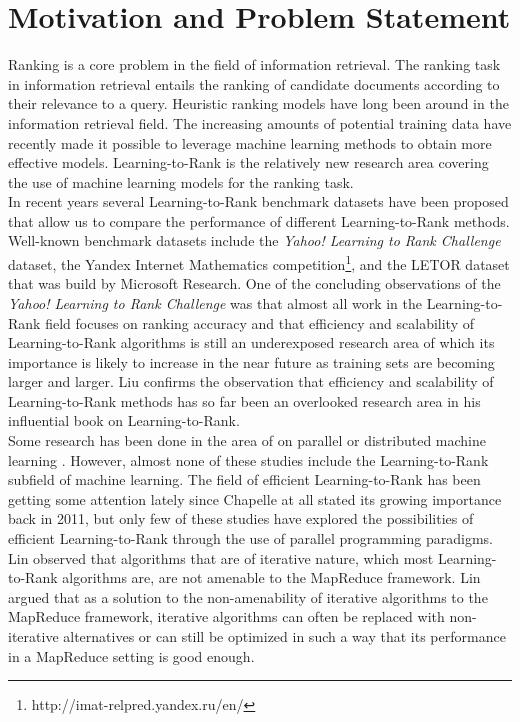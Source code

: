 \chapter{Motivation and Problem Statement}
Ranking is a core problem in the field of information retrieval. The ranking task in information retrieval entails the ranking of candidate documents according to their relevance to a query. Heuristic ranking models have long been around in the information retrieval field. The increasing amounts of potential training data have recently made it possible to leverage machine learning methods to obtain more effective models. Learning-to-Rank is the relatively new research area covering the use of machine learning models for the ranking task.\\

In recent years several Learning-to-Rank benchmark datasets have been proposed that allow us to compare the performance of different Learning-to-Rank methods. Well-known benchmark datasets include the \emph{Yahoo! Learning to Rank Challenge} dataset\cite{Chapelle2011a}, the Yandex Internet Mathematics competition\footnote{http://imat-relpred.yandex.ru/en/}, and the LETOR dataset\cite{Qin2010} that was build by Microsoft Research. One of the concluding observations of the \emph{Yahoo! Learning to Rank Challenge} was that almost all work in the Learning-to-Rank field focuses on ranking accuracy and that efficiency and scalability of Learning-to-Rank algorithms is still an underexposed research area of which its importance is likely to increase in the near future as training sets are becoming larger and larger\cite{Chapelle2011b}. Liu\cite{Liu2007} confirms the observation that efficiency and scalability of Learning-to-Rank methods has so far been an overlooked research area in his influential book on Learning-to-Rank.\\

Some research has been done in the area of on parallel or distributed machine learning \cite{Chu2007,Chang2007}. However, almost none of these studies include the Learning-to-Rank subfield of machine learning. The field of efficient Learning-to-Rank has been getting some attention lately \cite{Asadi2013a,Asadi2013b,Busa-Fekete2012,Sousa2012,Shukla2012} since Chapelle at all \cite{Chapelle2011b} stated its growing importance back in 2011, but only few of these studies \cite{Sousa2012,Shukla2012} have explored the possibilities of efficient Learning-to-Rank through the use of parallel programming paradigms. Lin \cite{Lin2013} observed that algorithms that are of iterative nature, which most Learning-to-Rank algorithms are, are not amenable to the MapReduce framework. Lin argued that as a solution to the non-amenability of iterative algorithms to the MapReduce framework, iterative algorithms can often be replaced with non-iterative alternatives or can still be optimized in such a way that its performance in a MapReduce setting is good enough.\\

